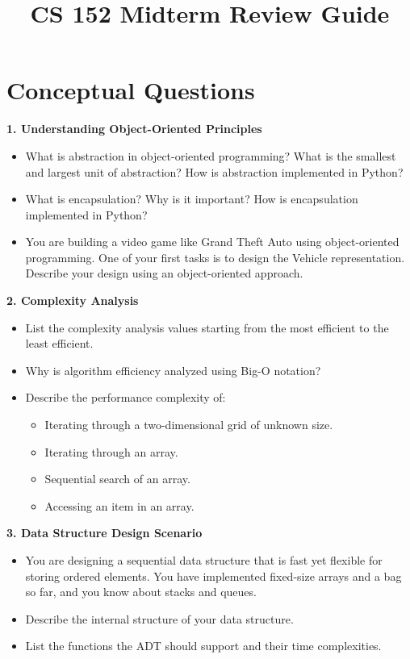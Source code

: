 \documentclass{article}
\begin{document}
\title{CS 152 Midterm Review Guide}
\author{}
\date{}
\maketitle

\section{Conceptual Questions}

\textbf{1. Understanding Object-Oriented Principles}
\begin{itemize}
    \item What is abstraction in object-oriented programming? What is the smallest and largest unit of abstraction? How is abstraction implemented in Python?
    \item What is encapsulation? Why is it important? How is encapsulation implemented in Python?
    \item You are building a video game like Grand Theft Auto using object-oriented programming. One of your first tasks is to design the Vehicle representation. Describe your design using an object-oriented approach.
\end{itemize}

\textbf{2. Complexity Analysis}
\begin{itemize}
    \item List the complexity analysis values starting from the most efficient to the least efficient.
    \item Why is algorithm efficiency analyzed using Big-O notation?
    \item Describe the performance complexity of:
    \begin{itemize}
        \item Iterating through a two-dimensional grid of unknown size.
        \item Iterating through an array.
        \item Sequential search of an array.
        \item Accessing an item in an array.
    \end{itemize}
\end{itemize}


\textbf{3. Data Structure Design Scenario}
\begin{itemize}
    \item You are designing a sequential data structure that is fast yet flexible for storing ordered elements. You have implemented fixed-size arrays and a bag so far, and you know about stacks and queues.
    \item Describe the internal structure of your data structure.
    \item List the functions the ADT should support and their time complexities.
\end{itemize}
\end{document}
